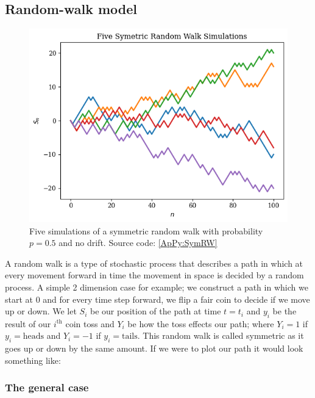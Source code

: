 \subsection{Random-walk model}\label{subsec: RW model}

\begin{figure}[]
    \centering
    \includegraphics[width=\sOneSize\textwidth]{Chapters/C1/plots/RW_Simulations.png}
    \caption{Five simulations of a symmetric random walk with probability \(p = 0.5\) and no drift. Source code: \autoref{ApPy:SymRW}}\label{C1fig:OptionVolume}
\end{figure}

A random walk is a type of stochastic process that describes a path in which at every movement forward in time the movement in space is decided by a random process. A simple 2 dimension case for example; we construct a path in which we start at 0 and for every time step forward, we flip a fair coin to decide if we move up or down. We let \( S_i \) be our position of the path at time \( t = t_i \) and \(y_i\) be the result of our \( i^\text{th} \) coin toss and \( Y_i \) be how the toss effects our path; where \( Y_i = 1 \) if \( y_i = \text{heads} \) and \(Y_i = -1\) if \( y_i = \text{tails} \). This random walk is called symmetric as it goes up or down by the same amount. If we were to plot our path it would look something like:

\subsubsection{The general case}

